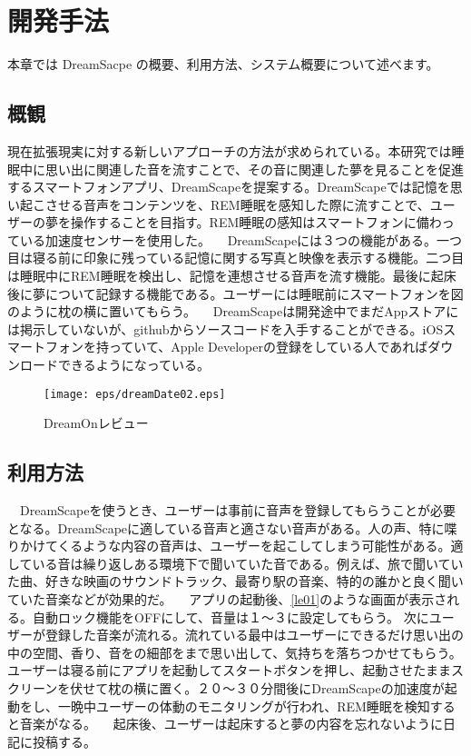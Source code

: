 \chapter{開発手法}
\label{chap:coding}

本章では DreamSacpe の概要、利用方法、システム概要について述べます。

\section{概観}
現在拡張現実に対する新しいアプローチの方法が求められている。本研究では睡眠中に思い出に関連した音を流すことで、その音に関連した夢を見ることを促進するスマートフォンアプリ、DreamScapeを提案する。DreamScapeでは記憶を思い起こさせる音声をコンテンツを、REM睡眠を感知した際に流すことで、ユーザーの夢を操作することを目指す。REM睡眠の感知はスマートフォンに備わっている加速度センサーを使用した。
　DreamScapeには３つの機能がある。一つ目は寝る前に印象に残っている記憶に関する写真と映像を表示する機能。二つ目は睡眠中にREM睡眠を検出し、記憶を連想させる音声を流す機能。最後に起床後に夢について記録する機能である。ユーザーには睡眠前にスマートフォンを図のように枕の横に置いてもらう。
　DreamScapeは開発途中でまだAppストアには掲示していないが、githubからソースコードを入手することができる。iOSスマートフォンを持っていて、Apple Developerの登録をしている人であればダウンロードできるようになっている。
\begin{figure}[htbp]
\begin{center}
\texttt{[image: eps/dreamDate02.eps]}
\caption{DreamOnレビュー}
\label{DreamOnレビュー}
\end{center}
\end{figure}

\section{利用方法}
　DreamScapeを使うとき、ユーザーは事前に音声を登録してもらうことが必要となる。DreamScapeに適している音声と適さない音声がある。人の声、特に喋りかけてくるような内容の音声は、ユーザーを起こしてしまう可能性がある。適している音は繰り返しある環境下で聞いていた音である。例えば、旅で聞いていた曲、好きな映画のサウンドトラック、最寄り駅の音楽、特的の誰かと良く聞いていた音楽などが効果的だ。
　アプリの起動後、\ref{le01}のような画面が表示される。自動ロック機能をOFFにして、音量は１〜３に設定してもらう。 次にユーザーが登録した音楽が流れる。流れている最中はユーザーにできるだけ思い出の中の空間、香り、音をの細部をまで思い出して、気持ちを落ちつかせてもらう。ユーザーは寝る前にアプリを起動してスタートボタンを押し、起動させたままスクリーンを伏せて枕の横に置く。２０〜３０分間後にDreamScapeの加速度が起動をし、一晩中ユーザーの体動のモニタリングが行われ、REM睡眠を検知すると音楽がなる。
　起床後、ユーザーは起床すると夢の内容を忘れないように日記に投稿する。

